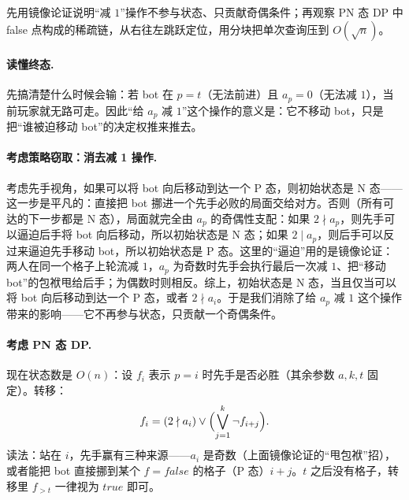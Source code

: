 \hint 先用镜像论证说明“减 $1$”操作不参与状态、只贡献奇偶条件；再观察 PN 态 DP 中 false 点构成的稀疏链，从右往左跳跃定位，用分块把单次查询压到 $O(\sqrt n)$。

\sol \paragraph{读懂终态.} 先搞清楚什么时候会输：若 bot 在 $p=t$（无法前进）且 $a_p=0$（无法减 $1$），当前玩家就无路可走。因此“给 $a_p$ 减 $1$”这个操作的意义是：它不移动 bot，只是把“谁被迫移动 bot”的决定权推来推去。

\paragraph{考虑策略窃取：消去减 1 操作.} 考虑先手视角，如果可以将 bot 向后移动到达一个 P 态，则初始状态是 N 态——这一步是平凡的：直接把 bot 挪进一个先手必败的局面交给对方。否则（所有可达的下一步都是 N 态），局面就完全由 $a_p$ 的奇偶性支配：如果 $2\nmid a_p$，则先手可以逼迫后手将 bot 向后移动，所以初始状态是 N 态；如果 $2\mid a_p$，则后手可以反过来逼迫先手移动 bot，所以初始状态是 P 态。这里的“逼迫”用的是镜像论证：两人在同一个格子上轮流减 $1$，$a_p$ 为奇数时先手会执行最后一次减 $1$、把“移动 bot”的包袱甩给后手；为偶数时则相反。综上，初始状态是 N 态，当且仅当可以将 bot 向后移动到达一个 P 态，或者 $2\nmid a_i$。于是我们消除了给 $a_p$ 减 $1$ 这个操作带来的影响——它不再参与状态，只贡献一个奇偶条件。

\paragraph{考虑 PN 态 DP.} 现在状态数是 $O(n)$：设 $f_i$ 表示 $p=i$ 时先手是否必胜（其余参数 $a,k,t$ 固定）。转移：
\[
 f_i=(2\nmid a_i)\lor\Bigl(\bigvee_{j=1}^{k}\lnot f_{i+j}\Bigr).
\]
读法：站在 $i$，先手赢有三种来源——$a_i$ 是奇数（上面镜像论证的“甩包袱”招），或者能把 bot 直接挪到某个 $f=false$ 的格子（P 态）$i+j$。$t$ 之后没有格子，转移里 $f_{>t}$ 一律视为 $true$ 即可。

